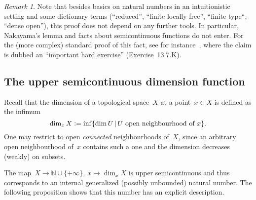 \documentclass[10pt]{amsart}
\theoremstyle{definition}
\theoremstyle{plain}
\theoremstyle{remark}
\newtheorem{rem}[defn]{Remark}
\newcommand{\NN}{\mathbb{N}}
\newcommand{\?}{\,{:}\,}
\renewcommand{\_}{\mathpunct{.}\,}
\newcommand{\defeq}{\vcentcolon=}
\begin{document}
\begin{rem}Note that besides basics on natural numbers in an intuitionistic
setting and some dictionary terms (``reduced'', ``finite locally free'',
``finite type``, ``dense open''), this proof does not depend on any further
tools. In particular, Nakayama's lemma and facts about semicontinuous functions
do not enter. For the (more complex) standard proof of this fact, see for
instance~\cite{vakil:foag}, where the claim is dubbed an ``important hard
exercise'' (Exercise~13.7.K).\end{rem}


\subsection{The upper semicontinuous dimension function} Recall that the
dimension of a topological space~$X$ at a point~$x \in X$ is defined as the
infimum
\[ \dim_x X \defeq \inf\{ \dim U \,|\, \text{$U$ open neighbourhood of~$x$} \}. \]
One may restrict to open \emph{connected} neighbourhoods of~$X$, since an
arbitrary open neighbourhood of~$x$ contains such a one and the dimension
decreases (weakly) on subsets.

The map~$X \to \NN \cup \{+\infty\},\ x \mapsto \dim_x X$ is upper
semicontinuous and thus corresponds to an internal generalized (possibly
unbounded) natural number. The following proposition shows that this number has
an explicit description.
\end{document}
